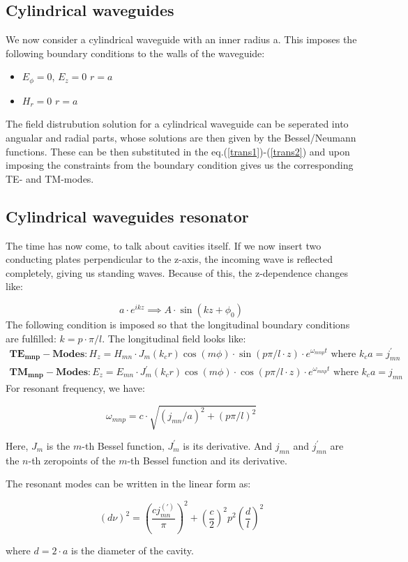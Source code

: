 \documentclass[a4paper]{article}
\begin{document}
\subsection{Cylindrical waveguides}
We now consider a cylindrical waveguide with an inner radius a. This imposes the following boundary conditions to the walls of the waveguide:
\begin{itemize}
		\item $E_{\phi} = 0$, $E_{z} = 0 $  $r = a$ 
		\item $H_{r} = 0 $  $r = a$ 
\end{itemize}

The field distrubution solution for a cylindrical waveguide can be seperated into angualar and radial parts, whose solutions are then given by the Bessel/Neumann functions. These can be then substituted in the eq.(\ref{trans1})-(\ref{trans2}) and upon imposing the constraints from the boundary condition gives us the corresponding TE- and TM-modes.

\subsection{Cylindrical waveguides resonator}
The time has now come, to talk about cavities itself. If we now insert two conducting plates perpendicular to the z-axis, the incoming wave is reflected completely, giving us standing waves. Because of this, the z-dependence changes like: 

\[
		a \cdot e^{ikz} \implies A \cdot \sin\left(kz + \phi_{0}\right)    
\]
The following condition is imposed so that the longitudinal boundary conditions are fulfilled: $k = p\cdot \pi /l $. The longitudinal field looks like: 
\begin{align*}
		\mathbf{TE_{mnp}-Modes}: H_{z} = H_{mn}\cdot J_{m} \left(k_{c}r \right) \cos\left(m \phi \right) \cdot \sin\left(p \pi / l \cdot z \right) \cdot e^{\omega_{mnp}t} \text{ where } k_{c}a=j_{mn}^{'}  \\
		\mathbf{TM_{mnp}-Modes}: E_{z} = E_{mn}\cdot J_{m}^{'}  \left(k_{c}r \right) \cos\left(m \phi \right) \cdot \cos\left(p \pi / l \cdot z \right) \cdot e^{\omega_{mnp}t} \text{ where } k_{c}a=j_{mn} 
\end{align*}
For resonant frequency, we have:

\[
		\omega_{mnp} = c \cdot \sqrt{\left(j_{mn}/a\right)^2 + \left(p \pi / l\right)^2} 
\]

Here, $J_{m}$ is the $m$-th Bessel function, $J_{m}^{'} $ is its derivative. And $j_{mn}$ and $j_{mn}^{'}$ are the $n$-th zeropoints of the $m$-th Bessel function and its derivative.

The resonant modes can be written in the linear form as:

\begin{equation}
		\left(d \nu \right)^2 = \left(\frac{cj_{mn}^{(')}}{\pi}\right)^2 + \left(\frac{c}{2}\right)^2 p^2 \left(\frac{d}{l}\right)^2
\end{equation}

where $d=2\cdot a$ is the diameter of the cavity.
\end{document}
